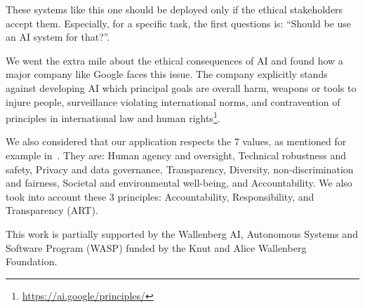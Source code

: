 \documentclass[12pt]{article}
\begin{document}
    These systems like this one should be deployed only if the ethical stakeholders accept them.
    Especially, for a specific task, the first questions is: ``Should be use an AI system for that?''.

    We went the extra mile about the ethical consequences of AI and found how a major company like Google faces this issue.
    The company explicitly stands against developing AI which principal goals are overall harm, weapons or tools to injure people, surveillance violating international norms, and contravention of principles in international law and human rights\footnote{\url{https://ai.google/principles/}}.

    We also considered that our application respects the 7 values, as mentioned for example in~\cite{easa:20210401.01}.
    They are: Human agency and oversight, Technical robustness and safety, Privacy and data governance, Transparency, Diversity, non-discrimination and fairness, Societal and environmental well-being, and Accountability.
    We also took into account these 3 principles: Accountability, Responsibility, and Transparency (ART)\cite{doi:10.1145/3278721.3278745}.

    \begin{ack}
        This work is partially supported by the Wallenberg AI, Autonomous Systems and Software Program (WASP) funded by the Knut and Alice Wallenberg Foundation.
    \end{ack}

    

    
\end{document}
